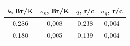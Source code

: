 \documentclass[a4paper, 12pt]{article}%
\begin{document}
\begin{enumerate}
\begin{tabular}{|c|c|c|c|}
\hline
$k$, Вт/K & $\sigma_k$, Вт/K & $q$, г/c & $\sigma_q$, г/c \\ \hline
0,286 & 0,008 & 0,238 & 0,004 \\ \hline
0,180 & 0,005 & 0,139 & 0,004 \\ \hline
\end{tabular}


\end{enumerate}
\end{document}
